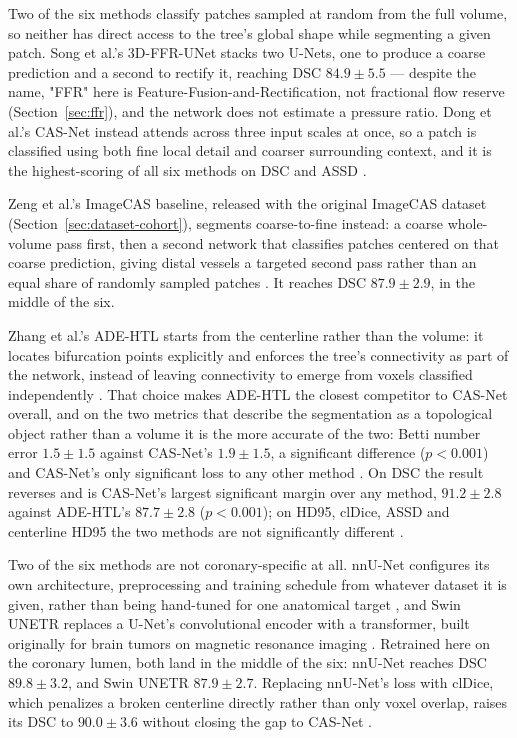 Two of the six methods classify patches sampled at random from the full volume, so neither has
direct access to the tree's global shape while segmenting a given patch.
Song et al.'s 3D-FFR-UNet stacks two U-Nets, one to produce a coarse prediction and a second to
rectify it, reaching DSC $84.9 \pm 5.5$ \cite{song2022ffrunet} --- despite the name, "FFR" here is
Feature-Fusion-and-Rectification, not fractional flow reserve (Section~\ref{sec:ffr}), and the
network does not estimate a pressure ratio.
Dong et al.'s CAS-Net instead attends across three input scales at once, so a patch is classified
using both fine local detail and coarser surrounding context, and it is the highest-scoring of all
six methods on DSC and ASSD \cite{dong2023casnet}.

Zeng et al.'s ImageCAS baseline, released with the original ImageCAS dataset
(Section~\ref{sec:dataset-cohort}), segments coarse-to-fine instead: a coarse whole-volume pass
first, then a second network that classifies patches centered on that coarse prediction, giving
distal vessels a targeted second pass rather than an equal share of randomly sampled patches
\cite{zeng2023imagecas}.
It reaches DSC $87.9 \pm 2.9$, in the middle of the six.

Zhang et al.'s ADE-HTL starts from the centerline rather than the volume: it locates bifurcation
points explicitly and enforces the tree's connectivity as part of the network, instead of leaving
connectivity to emerge from voxels classified independently \cite{zhang2024adehtl}.
That choice makes ADE-HTL the closest competitor to CAS-Net overall, and on the two metrics that
describe the segmentation as a topological object rather than a volume it is the more accurate of
the two: Betti number error $1.5 \pm 1.5$ against CAS-Net's $1.9 \pm 1.5$, a significant difference
($p<0.001$) and CAS-Net's only significant loss to any other method
\cite{bransby2026imagecasx,zhang2024adehtl}.
On DSC the result reverses and is CAS-Net's largest significant margin over any method,
$91.2 \pm 2.8$ against ADE-HTL's $87.7 \pm 2.8$ ($p<0.001$); on HD95, clDice, ASSD and centerline
HD95 the two methods are not significantly different \cite{bransby2026imagecasx}.

Two of the six methods are not coronary-specific at all.
nnU-Net configures its own architecture, preprocessing and training schedule from whatever dataset
it is given, rather than being hand-tuned for one anatomical target \cite{isensee2021nnunet}, and
Swin UNETR replaces a U-Net's convolutional encoder with a transformer, built originally for brain
tumors on magnetic resonance imaging \cite{hatamizadeh2022swinunetr}.
Retrained here on the coronary lumen, both land in the middle of the six: nnU-Net reaches DSC
$89.8 \pm 3.2$, and Swin UNETR $87.9 \pm 2.7$.
Replacing nnU-Net's loss with clDice, which penalizes a broken centerline directly rather than only
voxel overlap, raises its DSC to $90.0 \pm 3.6$ without closing the gap to CAS-Net
\cite{shit2021cldice,bransby2026imagecasx}.

